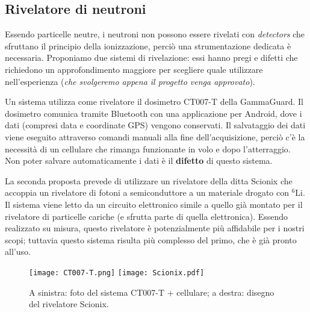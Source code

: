 \subsection{Rivelatore di neutroni}
Essendo particelle neutre, i neutroni non possono essere rivelati con \emph{detectors} che sfruttano il principio della ionizzazione, perciò una strumentazione dedicata è necessaria.
Proponiamo due sistemi di rivelazione: essi hanno pregi e difetti che richiedono un approfondimento maggiore per scegliere quale utilizzare nell'esperienza (\emph{che svolgeremo appena il progetto venga approvato}). 

Un sistema utilizza come rivelatore il dosimetro CT007-T della GammaGuard. Il dosimetro comunica tramite Bluetooth con una applicazione per Android, dove i dati (compresi data e coordinate GPS) vengono conservati. Il salvataggio dei dati viene eseguito attraverso comandi manuali alla fine dell'acquisizione, perciò c'è la necessità di un cellulare che rimanga funzionante in volo e dopo l'atterraggio. Non poter salvare automaticamente i dati è il \textbf{difetto} di questo sistema.

La seconda proposta prevede di utilizzare un rivelatore della ditta Scionix che accoppia un rivelatore di fotoni a semiconduttore a un materiale drogato con $^6$Li. Il sistema viene letto da un circuito elettronico simile a quello già montato per il rivelatore di particelle cariche (e sfrutta parte di quella elettronica). Essendo realizzato su misura, questo rivelatore è potenzialmente più affidabile per i nostri scopi; tuttavia questo sistema risulta più complesso del primo, che è già pronto all'uso. 

\begin{figure}
    \centering
    \texttt{[image: CT007-T.png]}
    \quad
    \texttt{[image: Scionix.pdf]}
    \caption{A sinistra: foto del sistema CT007-T + cellulare; a destra: disegno del rivelatore Scionix.}
    \label{fig:my_label}
\end{figure}
